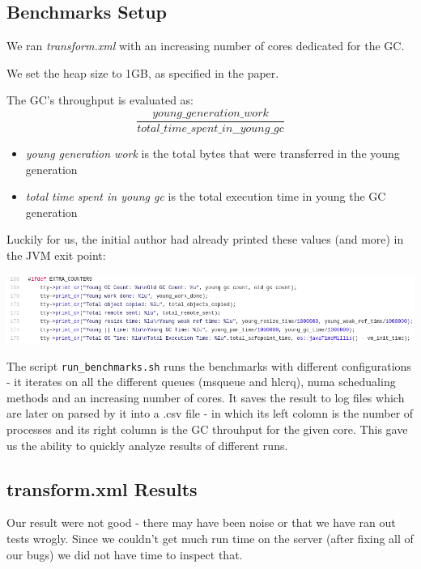 \documentclass{article}
\begin{document}
 \subsection{Benchmarks Setup}
 We ran \textit{transform.xml} with an increasing number of cores dedicated for the GC.

 We set the heap size to 1GB, as specified in the paper.

 The GC's throughput is evaluated as:
 \begin{equation}
	 \frac{young\_generation\_work}{total\_time\_spent\_in\_\_young\_gc}
 \end{equation}

 \begin{itemize}
   \item \textit{young generation work} is the total bytes that were transferred in the young generation
   \item \textit{total time spent in young gc} is the total execution time in young the GC generation
 \end{itemize}

 Luckily for us, the initial author had already printed these values (and more) in the JVM exit point:

 \includegraphics[width=\textwidth]{gc-debug-prints.png}

 The script \texttt{run\_benchmarks.sh} runs the benchmarks with different configurations - it iterates on all the different queues (msqueue and hlcrq), numa schedualing methods and an increasing number of cores. It saves the result to log files which are later on parsed by it into a .csv file - in which its left colomn is the number of processes and its right column is the GC throuhput for the given core.
This gave us the ability to quickly analyze results of different runs.

 \newpage

 \subsection{transform.xml Results}
 Our result were not good - there may have been noise or that we have ran out tests wrogly. Since we couldn't get much run time on the server (after fixing all of our bugs) we did not have time to inspect that.
\end{document}
